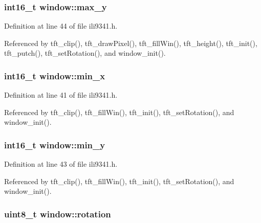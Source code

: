 \hypertarget{structwindow_a84f9c809e082563b33f845f3b1da9bf3}{
\subsubsection[{max\-\_\-y}]{\setlength{\rightskip}{0pt plus 5cm}int16\-\_\-t window\-::max\-\_\-y}}\label{structwindow_a84f9c809e082563b33f845f3b1da9bf3}


Definition at line 44 of file ili9341.\-h.



Referenced by tft\-\_\-clip(), tft\-\_\-draw\-Pixel(), tft\-\_\-fill\-Win(), tft\-\_\-height(), tft\-\_\-init(), tft\-\_\-putch(), tft\-\_\-set\-Rotation(), and window\-\_\-init().

\hypertarget{structwindow_ad6317eef8afe6cee398bfaae876f8a1d}{
\subsubsection[{min\-\_\-x}]{\setlength{\rightskip}{0pt plus 5cm}int16\-\_\-t window\-::min\-\_\-x}}\label{structwindow_ad6317eef8afe6cee398bfaae876f8a1d}


Definition at line 41 of file ili9341.\-h.



Referenced by tft\-\_\-clip(), tft\-\_\-fill\-Win(), tft\-\_\-init(), tft\-\_\-set\-Rotation(), and window\-\_\-init().

\hypertarget{structwindow_a33d39097fba2f3267bb0c003e88f4cd8}{
\subsubsection[{min\-\_\-y}]{\setlength{\rightskip}{0pt plus 5cm}int16\-\_\-t window\-::min\-\_\-y}}\label{structwindow_a33d39097fba2f3267bb0c003e88f4cd8}


Definition at line 43 of file ili9341.\-h.



Referenced by tft\-\_\-clip(), tft\-\_\-fill\-Win(), tft\-\_\-init(), tft\-\_\-set\-Rotation(), and window\-\_\-init().

\hypertarget{structwindow_afbd48ebcb41e68d0f458dac593578aa8}{
\subsubsection[{rotation}]{\setlength{\rightskip}{0pt plus 5cm}uint8\-\_\-t window\-::rotation}}\label{structwindow_afbd48ebcb41e68d0f458dac593578aa8}


